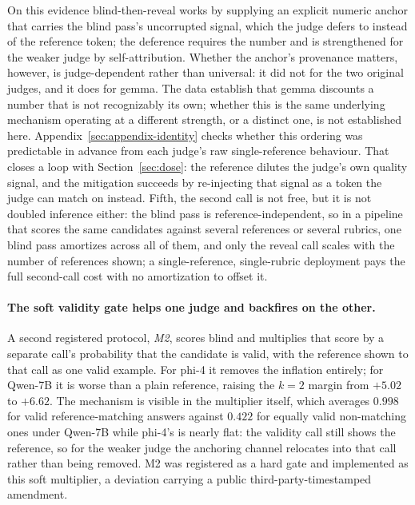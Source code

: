 \documentclass[11pt]{article}
\begin{document}
On this evidence blind-then-reveal works by supplying an explicit numeric anchor that carries the blind pass's uncorrupted signal, which the judge defers to instead of the reference token; the deference requires the number and is strengthened for the weaker judge by self-attribution.
Whether the anchor's provenance matters, however, is judge-dependent rather than universal: it did not for the two original judges, and it does for gemma.
The data establish that gemma discounts a number that is not recognizably its own; whether this is the same underlying mechanism operating at a different strength, or a distinct one, is not established here. Appendix~\ref{sec:appendix-identity} checks whether this ordering was predictable in advance from each judge's raw single-reference behaviour.
That closes a loop with Section~\ref{sec:dose}: the reference dilutes the judge's own quality signal, and the mitigation succeeds by re-injecting that signal as a token the judge can match on instead.
Fifth, the second call is not free, but it is not doubled inference either: the blind pass is reference-independent, so in a pipeline that scores the same candidates against several references or several rubrics, one blind pass amortizes across all of them, and only the reveal call scales with the number of references shown; a single-reference, single-rubric deployment pays the full second-call cost with no amortization to offset it.

\paragraph{The soft validity gate helps one judge and backfires on the other.}
A second registered protocol, \emph{M2}, scores blind and multiplies that score by a separate call's probability that the candidate is valid, with the reference shown to that call as one valid example.
For phi-4 it removes the inflation entirely; for Qwen-7B it is worse than a plain reference, raising the $k{=}2$ margin from $+5.02$ to $+6.62$.
The mechanism is visible in the multiplier itself, which averages $0.998$ for valid reference-matching answers against $0.422$ for equally valid non-matching ones under Qwen-7B while phi-4's is nearly flat: the validity call still shows the reference, so for the weaker judge the anchoring channel relocates into that call rather than being removed.
M2 was registered as a hard gate and implemented as this soft multiplier, a deviation carrying a public third-party-timestamped amendment.
\end{document}
